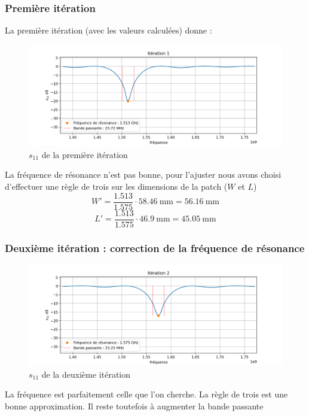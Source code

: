 \documentclass[Deriaz_Traiber_Labo02.tex]{subfiles}
\begin{document}
\subsubsection{Première itération}
La première itération (avec les valeurs calculées) donne :
\begin{figure}[H]
\centering
\includegraphics[width=15cm]{../Calculs/run_id_fr4_1.png}
\caption[caption]{$s_{11}$ de la première itération}
\end{figure}
La fréquence de résonance n'est pas bonne, pour l'ajuster nous avons choisi d'effectuer une règle de trois sur les dimensions de la patch ($W$ et $L$)
$$W'=\frac{1.513}{1.575}\cdot \SI{58.46}{\milli\meter}=\SI{56.16}{\milli\meter}$$
$$L'=\frac{1.513}{1.575}\cdot \SI{46.9}{\milli\meter}=\SI{45.05}{\milli\meter}$$
\subsubsection{Deuxième itération : correction de la fréquence de résonance}
\begin{figure}[H]
\centering
\includegraphics[width=15cm]{../Calculs/run_id_fr4_2.png}
\caption[caption]{$s_{11}$ de la deuxième itération}
\end{figure}
La fréquence est parfaitement celle que l'on cherche. La règle de trois est une bonne approximation. Il reste toutefois à augmenter la bande passante
\end{document}
